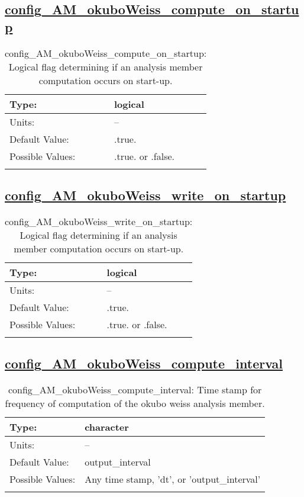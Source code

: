 \subsection[config\_AM\_okuboWeiss\_compute\_on\_startup]{\hyperref[sec:nm_tab_AM_okuboWeiss]{config\_AM\_okuboWeiss\_compute\_on\_startup}}
\label{subsec:nm_sec_config_AM_okuboWeiss_compute_on_startup}
\begin{center}
\begin{longtable}{| p{2.0in} || p{4.0in} |}
    \hline
    Type: & logical \\
    \hline
    Units: & -- \\
    \hline
    Default Value: & .true. \\
    \hline
    Possible Values: & .true. or .false. \\
    \hline
    \caption{config\_AM\_okuboWeiss\_compute\_on\_startup: Logical flag determining if an analysis member computation occurs on start-up.}
\end{longtable}
\end{center}
\subsection[config\_AM\_okuboWeiss\_write\_on\_startup]{\hyperref[sec:nm_tab_AM_okuboWeiss]{config\_AM\_okuboWeiss\_write\_on\_startup}}
\label{subsec:nm_sec_config_AM_okuboWeiss_write_on_startup}
\begin{center}
\begin{longtable}{| p{2.0in} || p{4.0in} |}
    \hline
    Type: & logical \\
    \hline
    Units: & -- \\
    \hline
    Default Value: & .true. \\
    \hline
    Possible Values: & .true. or .false. \\
    \hline
    \caption{config\_AM\_okuboWeiss\_write\_on\_startup: Logical flag determining if an analysis member computation occurs on start-up.}
\end{longtable}
\end{center}
\subsection[config\_AM\_okuboWeiss\_compute\_interval]{\hyperref[sec:nm_tab_AM_okuboWeiss]{config\_AM\_okuboWeiss\_compute\_interval}}
\label{subsec:nm_sec_config_AM_okuboWeiss_compute_interval}
\begin{center}
\begin{longtable}{| p{2.0in} || p{4.0in} |}
    \hline
    Type: & character \\
    \hline
    Units: & -- \\
    \hline
    Default Value: & output\_interval \\
    \hline
    Possible Values: & Any time stamp, 'dt', or 'output\_interval' \\
    \hline
    \caption{config\_AM\_okuboWeiss\_compute\_interval: Time stamp for frequency of computation of the okubo weiss analysis member.}
\end{longtable}
\end{center}

